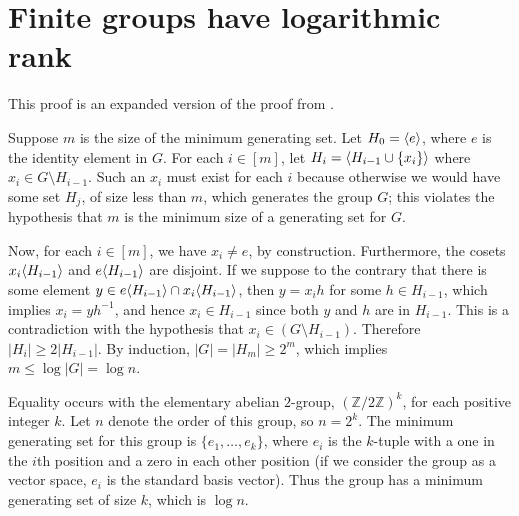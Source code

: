 \section{Finite groups have logarithmic rank}\label{app:log}
This proof is an expanded version of the proof from \autocite{arvind07}.

Suppose $m$ is the size of the minimum generating set.
Let $H_0 = \langle e \rangle$, where $e$ is the identity element in $G$.
For each $i \in [m]$, let $H_i = \langle H_{i - 1} \cup \{x_i\} \rangle$ where $x_i \in G \setminus H_{i - 1}$.
Such an $x_i$ must exist for each $i$ because otherwise we would have some set $H_j$, of size less than $m$, which generates the group $G$; this violates the hypothesis that $m$ is the minimum size of a generating set for $G$.

Now, for each $i \in [m]$, we have $x_i \neq e$, by construction.
Furthermore, the cosets $x_i \langle H_{i - 1} \rangle$ and $e \langle H_{i - 1} \rangle$ are disjoint.
If we suppose to the contrary that there is some element $y \in e \langle H_{i - 1} \rangle \cap x_i \langle H_{i - 1} \rangle$, then $y = x_i h$ for some $h \in H_{i - 1}$, which implies $x_i = yh^{-1}$, and hence $x_i \in H_{i - 1}$ since both $y$ and $h$ are in $H_{i - 1}$.
This is a contradiction with the hypothesis that $x_i \in (G \setminus H_{i - 1})$.
Therefore $|H_i| \geq 2 |H_{i - 1}|$.
By induction, $|G| = |H_m| \geq 2^m$, which implies $m \leq \log |G| = \log n$.

Equality occurs with the elementary abelian $2$-group, $(\mathbb{Z} / 2 \mathbb{Z})^k$, for each positive integer $k$.
Let $n$ denote the order of this group, so $n = 2^k$.
The minimum generating set for this group is $\{e_1, \dotsc, e_k\}$, where $e_i$ is the $k$-tuple with a one in the $i$th position and a zero in each other position (if we consider the group as a vector space, $e_i$ is the standard basis vector).
Thus the group has a minimum generating set of size $k$, which is $\log n$.
